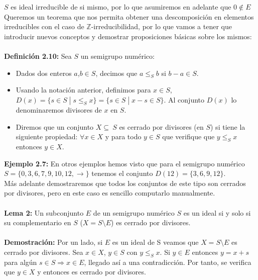 \documentclass[11pt,spanish]{book}
\begin{document}
$S$ es ideal irreducible de si mismo, por lo que asumiremos en adelante que $0\notin E$\\
Queremos un teorema que nos permita obtener una descomposición en elementos irreducibles con el caso de $\mathbb{Z}$-irreducibilidad, por lo que vamos a tener que introducir nuevos conceptos y demostrar proposiciones básicas sobre los mismos:\\
\\ \hypertarget{def2.10}{\textbf{Definición 2.10: }} Sea $S$ un semigrupo numérico:
\begin{itemize} 
 \item Dados dos enteros $a$,$b\in S$, decimos que $a\leq_{S} b$ si $b-a\in S$.
 \item Usando la notación anterior, definimos para $x\in S$, $D(x)=\{s\in S\;|\; s\leq_{S} x\}=\{s\in S\;|\; x-s\in S\}$. Al conjunto $D(x)$ lo denominaremos divisores de $x$ en $S$.
 \item Diremos que un conjunto $X\subseteq\ S$ es cerrado por divisores (en $S$) si tiene la siguiente propiedad: $\forall x\in X$ y para todo $y\in S$ que verifique que $y\leq_{S} x$ entonces $y\in X$. 
\end{itemize}
\textbf{Ejemplo 2.7: }
En otros ejemplos hemos visto que para el semigrupo numérico $S=\{0,3,6,7,9,10,12,\rightarrow\}$ tenemos el conjunto $D(12)=\{3,6,9,12\}$.\\

Más adelante demostraremos que todos los conjuntos de este tipo son cerrados por divisores, pero en este caso es sencillo computarlo manualmente.\\
\\ \textbf{Lema 2:} Un subconjunto $E$ de un semigrupo numérico $S$ es un ideal si y solo si su complementario en $S$ ($X=S\setminus E$) es cerrado por divisores.  \\
\\ \textbf{Demostración: } Por un lado, si $E$ es un ideal de S veamos que $X=S\setminus E$ es cerrado por divisores. Sea $x\in X$, $y\in S$ con $y\leq_{S} x$. Si $y\in E$ entonces $y=x+s$ para algún $s\in S\Rightarrow x\in E$, llegado así a una contradicción. Por tanto, se verifica que $y\in X$ y entonces es cerrado por divisores.\\
\end{document}
